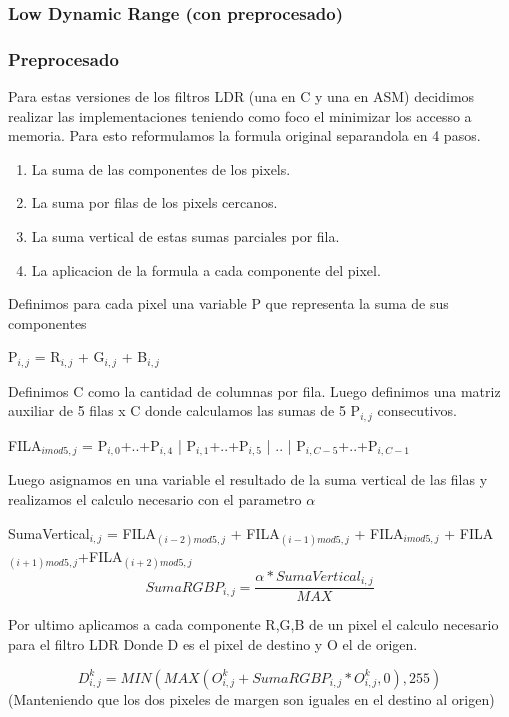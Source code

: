 \subsubsection{Low Dynamic Range (con preprocesado)}

\subsubsection*{Preprocesado}

Para estas versiones de los filtros LDR (una en C y una en ASM) decidimos realizar las implementaciones teniendo como foco el minimizar los accesso a memoria.
Para esto reformulamos la formula original separandola en 4 pasos.
\begin{enumerate}
\item La suma de las componentes de los pixels.
\item La suma por filas de los pixels cercanos.
\item La suma vertical de estas sumas parciales por fila.
\item La aplicacion de la formula a cada componente del pixel.
\end{enumerate}


Definimos para cada pixel una variable P que representa la suma de sus componentes
\begin{center}
P$_{i,j}$ = R$_{i,j}$ + G$_{i,j}$ + B$_{i,j}$
\end{center}

Definimos C como la cantidad de columnas por fila.
Luego definimos una matriz auxiliar de 5 filas x C donde calculamos las sumas de 5 P$_{i,j}$ consecutivos.
\begin{center}
FILA$_{i mod 5,j}$ = P$_{i,0}$+..+P$_{i,4}$ | P$_{i,1}$+..+P$_{i,5}$ | .. | P$_{i,C-5}$+..+P$_{i,C-1}$
\end{center}

Luego asignamos en una variable el resultado de la suma vertical de las filas y realizamos el calculo necesario con el parametro $\alpha$
\begin{center}
SumaVertical$_{i,j}$ = FILA$_{(i-2) mod 5,j}$ + FILA$_{(i-1) mod 5,j}$ + FILA$_{i mod 5,j}$ + FILA$_{(i+1) mod 5,j}$+FILA$_{(i+2) mod 5,j}$ \\
 \[ SumaRGBP_{i,j} = \frac{ \alpha * SumaVertical_{i,j} }{MAX} \]
\end{center}

Por ultimo aplicamos a cada componente R,G,B de un pixel el calculo necesario para el filtro LDR
Donde D es el pixel de destino y O el de origen.
\begin{center}
\[  D^{k}_{i,j}  =  MIN( MAX(  O^{k}_{i,j} + SumaRGBP_{i,j} * O^{k}_{i,j}, 0), 255) \] 
 (Manteniendo que los dos pixeles de margen son iguales en el destino al origen)
 \end{center}


